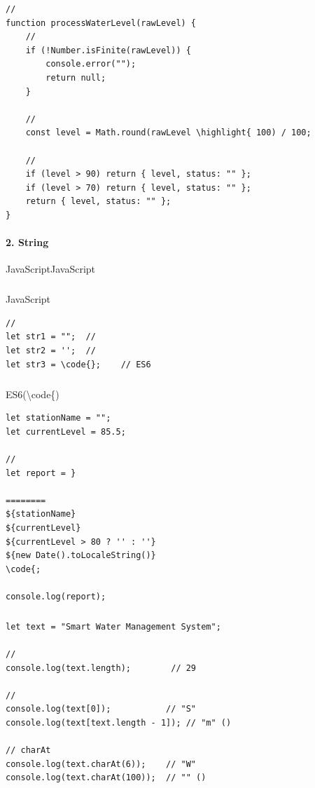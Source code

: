 \important{}
\begin{lstlisting}[style=javascript]
// 
function processWaterLevel(rawLevel) {
    // 
    if (!Number.isFinite(rawLevel)) {
        console.error("");
        return null;
    }
    
    // 
    const level = Math.round(rawLevel \highlight{ 100) / 100;
    
    // 
    if (level > 90) return { level, status: "" };
    if (level > 70) return { level, status: "" };
    return { level, status: "" };
}
\end{lstlisting}

\hypertarget{string}{%
\paragraph{2. String}\label{string}}

JavaScriptJavaScript

\hypertarget{section-20}{%
\subparagraph{}\label{section-20}}

JavaScript

\begin{lstlisting}[style=javascript]
// 
let str1 = "";  // 
let str2 = '';  // 
let str3 = \code{};    // ES6
\end{lstlisting}

\hypertarget{section-21}{%
\subparagraph{}\label{section-21}}

ES6(\textbackslash code\{)

\begin{lstlisting}[style=javascript]
let stationName = "";
let currentLevel = 85.5;

// 
let report = }

========
${stationName}
${currentLevel}
${currentLevel > 80 ? '' : ''}
${new Date().toLocaleString()}
\code{;

console.log(report);
\end{lstlisting}

\hypertarget{section-22}{%
\subparagraph{}\label{section-22}}

\begin{lstlisting}[style=javascript]
let text = "Smart Water Management System";

// 
console.log(text.length);        // 29

// 
console.log(text[0]);           // "S"
console.log(text[text.length - 1]); // "m" ()

// charAt
console.log(text.charAt(6));    // "W"
console.log(text.charAt(100));  // "" ()
\end{lstlisting}

